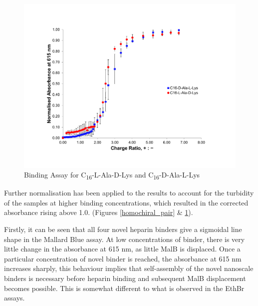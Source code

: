 \begin{figure} [h!]
\centering
\includegraphics[scale=0.42]{Mallard_Blue/Heterochiral_pair_-_MalB.pdf}
\caption{Binding Assay for C\textsubscript{16}-L-Ala-D-Lys and C\textsubscript{16}-D-Ala-L-Lys}
\label{heterochiral_pair}
\end{figure}
\newpage
Further normalisation has been applied to the results to account for the turbidity of the samples at higher binding concentrations, which resulted in the corrected absorbance rising above 1.0. (Figures \ref{homochiral_pair} \& \ref{heterochiral_pair}).

Firstly, it can be seen that all four novel heparin binders give a sigmoidal line shape in the Mallard Blue assay. At low concentrations of binder, there is very little change in the absorbance at 615 nm, as little MalB is displaced. Once a particular concentration of novel binder is reached, the absorbance at 615 nm increases sharply, this behaviour implies that self-assembly of the novel nanoscale binders is necessary before heparin binding and subsequent MalB displacement becomes possible. This is somewhat different to what is observed in the EthBr assays.

